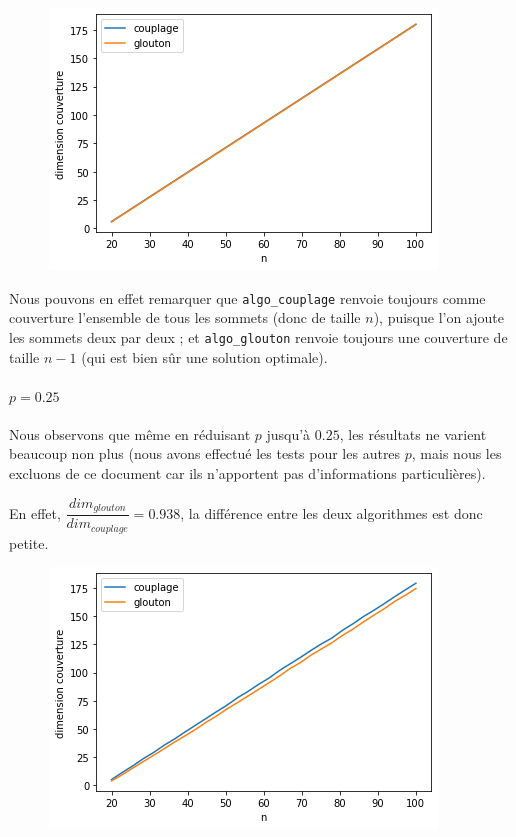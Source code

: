 \documentclass[12pt]{article}
\begin{document}
\begin{enumerate}
                    \begin{figure}[h]
                        \includegraphics[scale=0.5]{figures/qualite_1.png}
                        \centering
                    \end{figure}

                    Nous pouvons en effet remarquer que \texttt{algo\_couplage} renvoie toujours comme couverture l'ensemble de tous les sommets (donc de taille $n$), puisque l'on ajoute les sommets deux par deux ; et \texttt{algo\_glouton} renvoie toujours une couverture de taille $n-1$ (qui est bien sûr une solution optimale).

                \paragraph{$p = 0.25$}
                    Nous observons que même en réduisant $p$ jusqu'à $0.25$, les résultats ne varient beaucoup non plus (nous avons effectué les tests pour les autres $p$, mais nous les excluons de ce document car ils n'apportent pas d'informations particulières).
                    
                    En effet, $\dfrac{dim_{glouton}}{dim_{couplage}} = 0.938 $, la différence entre les deux algorithmes est donc petite.
                    
                    \begin{figure}[H]
                        \includegraphics[scale=0.5]{figures/qualite_025.png}
                        \centering
                    \end{figure}
                

\end{enumerate}
\end{document}
